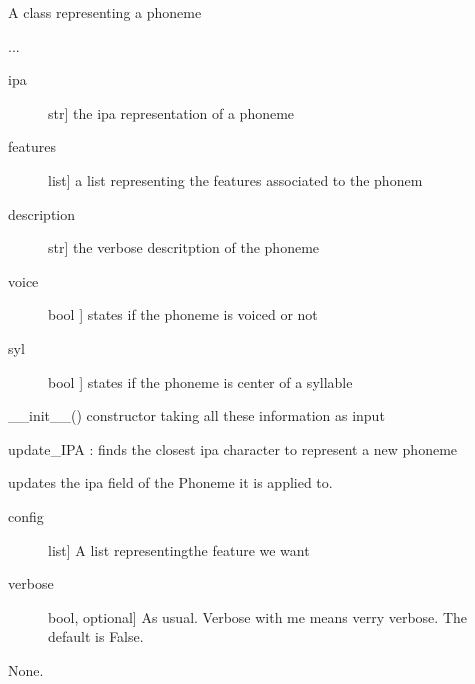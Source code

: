 \documentclass[letterpaper,10pt,english]{sphinxmanual}
\begin{document}
\begin{fulllineitems}
\label{\detokenize{index:Phoneme.Phoneme}}
\sphinxAtStartPar
A class representing a phoneme

\sphinxAtStartPar
...
\begin{description}
\item[{ipa}] \leavevmode{[}str{]}
\sphinxAtStartPar
the ipa representation of a phoneme

\item[{features}] \leavevmode{[}list{]}
\sphinxAtStartPar
a list representing the features associated to the phonem

\item[{description}] \leavevmode{[}str{]}
\sphinxAtStartPar
the verbose descritption of the phoneme

\item[{voice}] \leavevmode{[}bool {]}
\sphinxAtStartPar
states if the phoneme is voiced or not

\item[{syl}] \leavevmode{[}bool {]}
\sphinxAtStartPar
states if the phoneme is center of a syllable

\end{description}

\sphinxAtStartPar
\_\_init\_\_() constructor taking all these information as input

\sphinxAtStartPar
update\_IPA  : finds the closest ipa character to represent a new phoneme

\begin{fulllineitems}
\label{\detokenize{index:Phoneme.Phoneme.update_IPA}}
\sphinxAtStartPar
updates the ipa field of the Phoneme it is applied to.
\begin{description}
\item[{config}] \leavevmode{[}list{]}
\sphinxAtStartPar
A list representingthe feature we want

\item[{verbose}] \leavevmode{[}bool, optional{]}
\sphinxAtStartPar
As usual. Verbose with me means verry verbose. The default is False.

\end{description}

\sphinxAtStartPar
None.

\end{fulllineitems}


\end{fulllineitems}
\end{document}
